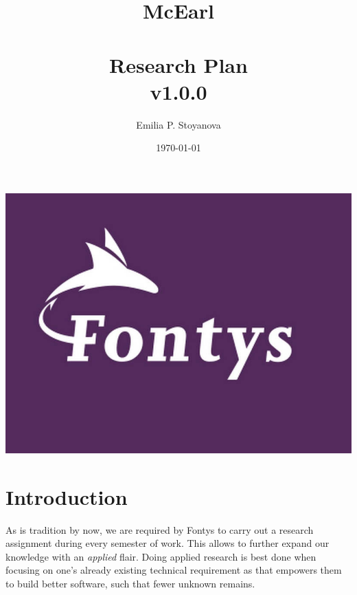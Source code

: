 \documentclass{article}
\title{\textbf{McEarl} \\ \hfill \\ \large Research Plan \\ \large v1.0.0}
\author{Emilia P. Stoyanova}
\date{\today}
\begin{document}
\maketitle
\begin{center}
    \includegraphics[width=\textwidth,height=\textheight,keepaspectratio]{res/fontys.jpg}
\end{center}

\newpage
\tableofcontents
\listoftables

\fancyhead[l]{}
\fancyfoot[c]{\thepage}

\newpage
\section{Introduction}
\label{section:introduction}
    As is tradition by now, we are required by Fontys to carry out a research assignment during every semester of work. This allows to further expand our knowledge with an \textit{applied} flair. Doing applied research is best done when focusing on one's already existing technical requirement as that empowers them to build better software, such that fewer unknown remains. \\
\end{document}
